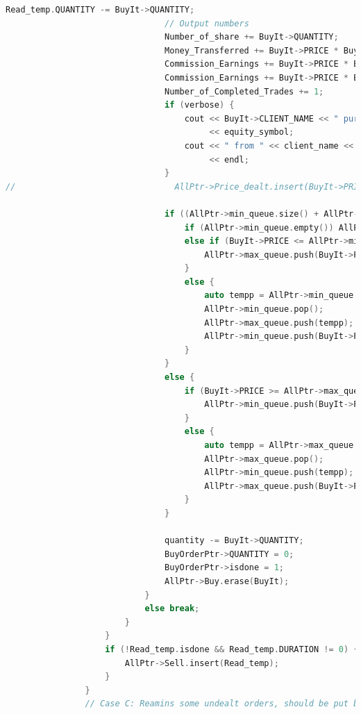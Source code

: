 \documentclass{article}
\begin{document}
\begin{lstlisting}[language=C++]
                                Read_temp.QUANTITY -= BuyIt->QUANTITY;
                                // Output numbers
                                Number_of_share += BuyIt->QUANTITY;
                                Money_Transferred += BuyIt->PRICE * BuyIt->QUANTITY;
                                Commission_Earnings += BuyIt->PRICE * BuyIt->QUANTITY / 100;
                                Commission_Earnings += BuyIt->PRICE * BuyIt->QUANTITY / 100;
                                Number_of_Completed_Trades += 1;
                                if (verbose) {
                                    cout << BuyIt->CLIENT_NAME << " purchased " << BuyIt->QUANTITY << " shares of "
                                         << equity_symbol;
                                    cout << " from " << client_name << " for $" << BuyIt->PRICE << "/share"
                                         << endl;
                                }
//                                AllPtr->Price_dealt.insert(BuyIt->PRICE);

                                if ((AllPtr->min_queue.size() + AllPtr->max_queue.size()) % 2 == 0) {
                                    if (AllPtr->min_queue.empty()) AllPtr->max_queue.push(BuyIt->PRICE);
                                    else if (BuyIt->PRICE <= AllPtr->min_queue.top()) {
                                        AllPtr->max_queue.push(BuyIt->PRICE);
                                    }
                                    else {
                                        auto tempp = AllPtr->min_queue.top();
                                        AllPtr->min_queue.pop();
                                        AllPtr->max_queue.push(tempp);
                                        AllPtr->min_queue.push(BuyIt->PRICE);
                                    }
                                }
                                else {
                                    if (BuyIt->PRICE >= AllPtr->max_queue.top()) {
                                        AllPtr->min_queue.push(BuyIt->PRICE);
                                    }
                                    else {
                                        auto tempp = AllPtr->max_queue.top();
                                        AllPtr->max_queue.pop();
                                        AllPtr->min_queue.push(tempp);
                                        AllPtr->max_queue.push(BuyIt->PRICE);
                                    }
                                }

                                quantity -= BuyIt->QUANTITY;
                                BuyOrderPtr->QUANTITY = 0;
                                BuyOrderPtr->isdone = 1;
                                AllPtr->Buy.erase(BuyIt);
                            }
                            else break;
                        }
                    }
                    if (!Read_temp.isdone && Read_temp.DURATION != 0) {
                        AllPtr->Sell.insert(Read_temp);
                    }
                }
                // Case C: Reamins some undealt orders, should be put back


\end{lstlisting}
\end{document}
